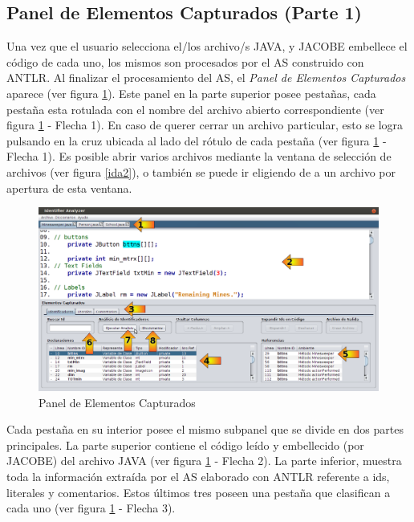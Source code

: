 \subsection{Panel de Elementos Capturados (Parte 1)}

Una vez que el usuario selecciona el/los archivo/s JAVA, y JACOBE embellece el código de cada uno, 
los mismos son procesados por el AS construido con ANTLR. Al finalizar el procesamiento del AS, el \textit{Panel de Elementos Capturados} aparece (ver figura \ref{ida3}). Este panel en la parte superior posee pestañas, cada pestaña esta rotulada con el nombre del archivo abierto correspondiente (ver figura \ref{ida3} - Flecha 1). En caso de querer cerrar un archivo particular, esto se logra pulsando en la cruz ubicada al lado del rótulo de cada pestaña (ver figura \ref{ida3} - Flecha 1). Es posible abrir varios archivos mediante la ventana de selección de archivos (ver figura \ref{ida2}), o también se puede ir eligiendo de a un archivo por apertura de esta ventana. 

\begin{figure}[t] %
\centerline{%
\includegraphics[scale= 0.42]{./cap4/ida_03.png}
}
\caption{Panel de Elementos Capturados}
\label{ida3}
\end{figure}

Cada pestaña en su interior posee el mismo subpanel que se divide en dos partes principales. La parte superior contiene el código leído y embellecido (por JACOBE) del archivo JAVA (ver figura \ref{ida3} - Flecha 2).
La parte inferior, muestra toda la información extraída por el AS elaborado con ANTLR referente a ids, literales y comentarios. Estos últimos tres poseen una pestaña que clasifican a cada uno (ver figura \ref{ida3} - Flecha 3). 

